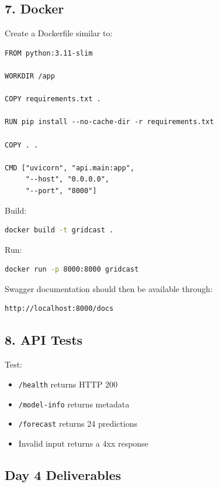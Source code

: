 \documentclass[11pt,a4paper]{article}
\begin{document}
\subsection{7. Docker}

Create a Dockerfile similar to:

\begin{lstlisting}
FROM python:3.11-slim

WORKDIR /app

COPY requirements.txt .

RUN pip install --no-cache-dir -r requirements.txt

COPY . .

CMD ["uvicorn", "api.main:app",
     "--host", "0.0.0.0",
     "--port", "8000"]
\end{lstlisting}

Build:

\begin{lstlisting}[language=bash]
docker build -t gridcast .
\end{lstlisting}

Run:

\begin{lstlisting}[language=bash]
docker run -p 8000:8000 gridcast
\end{lstlisting}

Swagger documentation should then be available through:

\begin{lstlisting}
http://localhost:8000/docs
\end{lstlisting}

\subsection{8. API Tests}

Test:

\begin{itemize}
    \item \texttt{/health} returns HTTP 200
    \item \texttt{/model-info} returns metadata
    \item \texttt{/forecast} returns 24 predictions
    \item Invalid input returns a 4xx response
\end{itemize}

\subsection{Day 4 Deliverables}
\end{document}
